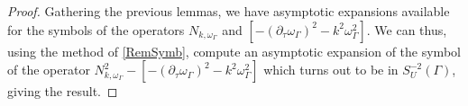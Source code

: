 \documentclass[a4paper]{article}
\begin{document}
\begin{proof}
	Gathering the previous lemmas, we have asymptotic expansions available for the symbols of the operators $N_{k,\omega_\Gamma}$ and $\left[-(\partial_\tau \omega_\Gamma )^2 - k^2\omega_\Gamma^2\right]$. We can thus, using the method of \autoref{RemSymb}, compute an asymptotic expansion of the symbol of the operator $N_{k,\omega_\Gamma}^2 - \left[-(\partial_\tau \omega_\Gamma )^2 - k^2\omega_\Gamma^2\right]$
	which turns out to be in $S^{-2}_U(\Gamma)$, giving the result. 
\end{proof}
\end{document}
